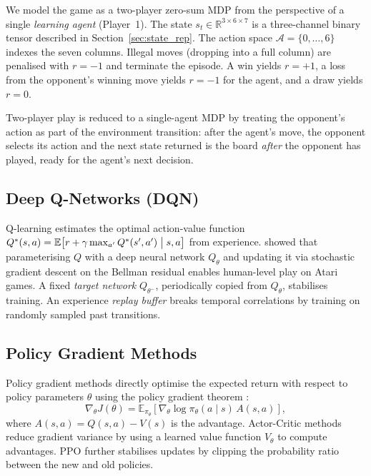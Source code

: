 \documentclass[10pt, letterpaper, twocolumn]{article}
\newcommand{\E}{\mathbb{E}}
\newcommand{\R}{\mathbb{R}}
\newcommand{\calA}{\mathcal{A}}
\begin{document}
We model the game as a two-player zero-sum MDP from the perspective of a
single \emph{learning agent} (Player~1).  The state $s_t \in \R^{3 \times
6 \times 7}$ is a three-channel binary tensor described in
Section~\ref{sec:state_rep}.  The action space $\calA = \{0, \dots, 6\}$
indexes the seven columns.  Illegal moves (dropping into a full column) are
penalised with $r = -1$ and terminate the episode.  A win yields $r = +1$,
a loss from the opponent's winning move yields $r = -1$ for the agent, and
a draw yields $r = 0$.

Two-player play is reduced to a single-agent MDP by treating the
opponent's action as part of the environment transition: after the agent's
move, the opponent selects its action and the next state returned is the
board \emph{after} the opponent has played, ready for the agent's next
decision.

\subsection{Deep Q-Networks (DQN)}

Q-learning \citep{watkins1992qlearning} estimates the optimal
action-value function $Q^*(s,a) = \E\bigl[r + \gamma \max_{a'} Q^*(s',a')
\bigm| s, a\bigr]$ from experience.  \citet{mnih2015dqn} showed that
parameterising $Q$ with a deep neural network $Q_\theta$ and updating it
via stochastic gradient descent on the Bellman residual enables
human-level play on Atari games.  A fixed \emph{target network}
$Q_{\theta^-}$, periodically copied from $Q_\theta$, stabilises training.
An experience \emph{replay buffer} \citep{lin1992experience} breaks
temporal correlations by training on randomly sampled past transitions.

\subsection{Policy Gradient Methods}

Policy gradient methods directly optimise the expected return with respect
to policy parameters $\theta$ using the policy gradient theorem
\citep{sutton2000policy}:
\begin{equation}
  \nabla_\theta J(\theta) = \E_{\pi_\theta}\!\left[
    \nabla_\theta \log \pi_\theta(a \mid s)\, A(s,a)
  \right],
\end{equation}
where $A(s,a) = Q(s,a) - V(s)$ is the advantage.  Actor-Critic methods
\citep{mnih2016a3c} reduce gradient variance by using a learned value
function $V_\theta$ to compute advantages.  PPO \citep{schulman2017ppo}
further stabilises updates by clipping the probability ratio between the
new and old policies.
\end{document}
